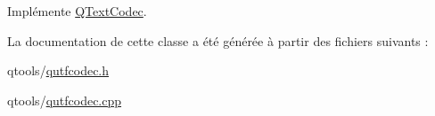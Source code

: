Implémente \hyperlink{class_q_text_codec_ab4e991cacb9c6acff167c4f8d4f2ec3e}{Q\+Text\+Codec}.



La documentation de cette classe a été générée à partir des fichiers suivants \+:\begin{DoxyCompactItemize}
\item 
qtools/\hyperlink{qutfcodec_8h}{qutfcodec.\+h}\item 
qtools/\hyperlink{qutfcodec_8cpp}{qutfcodec.\+cpp}\end{DoxyCompactItemize}
